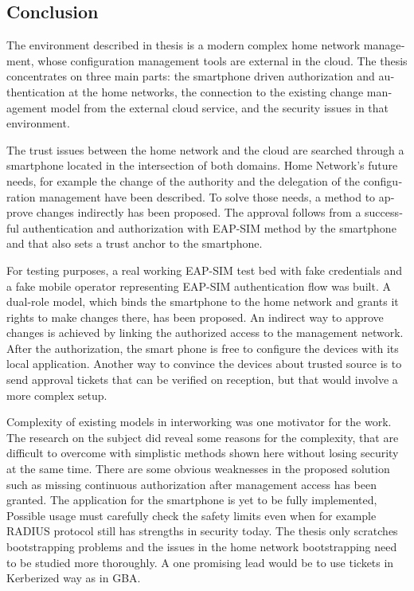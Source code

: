 \documentclass[12pt,a4paper,english]{tutthesis}
\begin{document}
\begin{otherlanguage}{english}
\chapter{Conclusion}
\label{sec-7}



The environment described in thesis is a modern complex home network
management, whose configuration management tools are external in the
cloud.  The thesis concentrates on three main parts:
the smartphone driven authorization and authentication at the home
networks, the connection to the existing change management model from
the external cloud service, and the security issues in that environment.

The trust issues between the home network and the cloud are searched
through a smartphone located in the intersection of both domains.
Home Network's future needs, for example the change of the authority
and the delegation of the configuration management have been
described.
To solve those needs, a method to approve changes indirectly has been
proposed. The approval follows from a successful authentication and
authorization with EAP-SIM method by the smartphone and that also sets
a trust anchor to the smartphone.


For testing purposes, a real working EAP-SIM test bed with fake credentials and
a fake mobile operator representing EAP-SIM authentication flow was
built. A dual-role model, which binds the smartphone to the home network and
grants it rights to make changes there, has been proposed.  
An indirect way to approve changes is achieved by linking the authorized
access to the management network. After the authorization, the smart
phone is free to configure the devices with its local application.
Another way to convince the
devices about trusted source is to send approval tickets that can
be verified on reception, but that would involve a more complex setup.

Complexity of existing models in interworking was one motivator for
the work. The research  on the subject did reveal some reasons 
for the complexity, that are difficult to overcome with simplistic 
methods shown here without losing security at the same time.
There are some obvious weaknesses in the proposed solution such as 
missing continuous authorization after management access has been
granted. The application for the smartphone is yet to be fully implemented,
Possible usage must carefully check the safety limits even when for
example RADIUS protocol still
has strengths in security today. The thesis only scratches bootstrapping
problems and the issues in the home network bootstrapping need to be studied
more thoroughly. A one promising lead would be to use tickets in Kerberized way as in GBA.



\end{otherlanguage}
\end{document}
